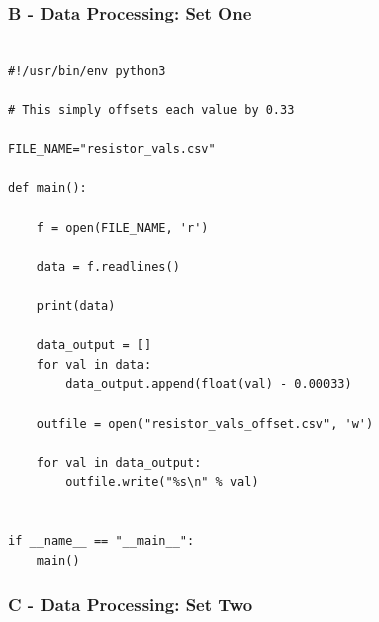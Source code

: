 \documentclass[10pt]{report}
\begin{document}
\subsubsection*{B - Data Processing: Set One}

\begin{lstlisting}

#!/usr/bin/env python3

# This simply offsets each value by 0.33

FILE_NAME="resistor_vals.csv"

def main():

    f = open(FILE_NAME, 'r')

    data = f.readlines()

    print(data)

    data_output = []
    for val in data:
        data_output.append(float(val) - 0.00033)

    outfile = open("resistor_vals_offset.csv", 'w')

    for val in data_output:
        outfile.write("%s\n" % val)


if __name__ == "__main__":
    main()

\end{lstlisting}

\subsubsection*{C - Data Processing: Set Two}
\end{document}
